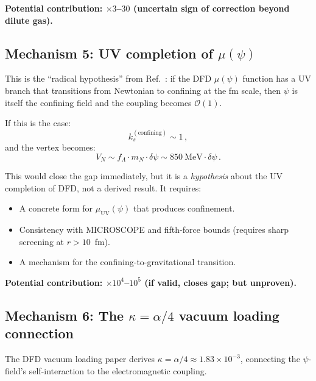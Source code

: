 \documentclass[aps,prd,twocolumn,superscriptaddress,floatfix,nofootinbib]{revtex4-2}
\newcommand{\mufunction}{\mu}
\newcommand{\kap}{\kappa}
\renewcommand{\order}[1]{\mathcal{O}\!\left(#1\right)}
\newcommand{\mN}{m_N}
\newcommand{\ks}{k_s}
\newcommand{\dpsi}{\delta\psi}
\newcommand{\alphafine}{\alpha}
\begin{document}
\textbf{Potential contribution: $\times 3$--$30$ (uncertain sign of
correction beyond dilute gas).}

\subsection{Mechanism 5: UV completion of $\mufunction(\psi)$}
\label{sec:UV_completion}

This is the ``radical hypothesis'' from Ref.~\cite{QCD_Psi}: if the DFD
$\mufunction(\psi)$ function has a UV branch that transitions from Newtonian
to confining at the fm scale, then $\psi$ is itself the confining field and
the coupling becomes $\order{1}$.

If this is the case:
\begin{equation}
\ks^{(\mathrm{confining})} \sim 1 \, ,
\end{equation}
and the vertex becomes:
\begin{equation}
V_N \sim f_\Lambda \cdot \mN \cdot \dpsi \sim 850~\text{MeV} \cdot \dpsi \, .
\end{equation}

This would close the gap immediately, but it is a \emph{hypothesis} about the
UV completion of DFD, not a derived result. It requires:
\begin{itemize}
\item A concrete form for $\mufunction_{\mathrm{UV}}(\psi)$ that produces
confinement.
\item Consistency with MICROSCOPE and fifth-force bounds (requires sharp
screening at $r > 10$~fm).
\item A mechanism for the confining-to-gravitational transition.
\end{itemize}

\textbf{Potential contribution: $\times 10^{4}$--$10^{5}$ (if valid, closes
gap; but unproven).}

\subsection{Mechanism 6: The $\kap = \alpha/4$ vacuum loading connection}
\label{sec:kappa_alpha}

The DFD vacuum loading paper derives $\kap = \alphafine/4 \approx 1.83
\times 10^{-3}$, connecting the $\psi$-field's self-interaction to the
electromagnetic coupling.
\end{document}
